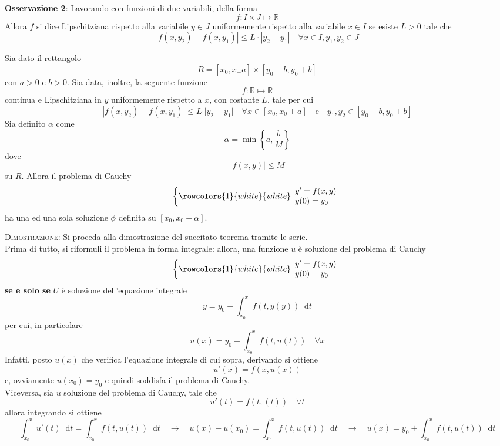 \documentclass[a4paper]{extarticle}
\newcommand*\dif{\mathop{}\!\mathrm{d}}
\begin{document}
\vspace{2em}
\noindent
\textbf{Osservazione 2}: Lavorando con funzioni di due variabili, della forma
\[f : I \times J \longmapsto \mathbb{R}\]
Allora $f$ si dice Lipschitziana rispetto alla variabile $y \in J$ uniformemente rispetto alla variabile $x \in I$ se esiste $L>0$ tale che
\[\left\vert f(x,y_2) - f(x,y_1) \right\vert \leq L \cdot \left\vert y_2 - y_1 \right\vert \hspace{1em} \forall x \in I, y_1,y_2 \in J\]


Sia dato il rettangolo
\[R=\left[x_0,x_+a\right] \times \left[y_0-b,y_0+b\right]\]
con $a>0$ e $b>0$. Sia data, inoltre, la seguente funzione
\[f : \mathbb{R} \longmapsto \mathbb{R}\]
continua e Lipschitziana in $y$ uniformemente rispetto a $x$, con costante $L$, tale per cui
\[\left\vert f(x,y_2) - f(x,y_1)\right\vert \leq L \cdot \vert y_2-y_1 \vert \hspace{1em} \forall x \in \left[x_0,x_0+a\right] \hspace{1em} \text{e} \hspace{1em} y_1,y_2 \in \left[y_0-b,y_0+b\right]\]
Sia definito $\alpha$ come
\[\alpha = \min \left\{a,\dfrac{b}{M}\right\}\]
dove
\[\left\vert f(x,y) \right \vert \leq M\]
su $R$. Allora il problema di Cauchy
\[\left\{
    \rowcolors{1}{white}{white}
    \begin{array}{lll}
        y'=f(x,y)\\
        y(0)=y_0
    \end{array}
\right.\]
ha una ed una sola soluzione $\phi$ definita su $\left[x_0,x_0+\alpha\right]$.

\vspace{2em}
\noindent
\normalfont \normalsize
\textsc{Dimostrazione}: Si proceda alla dimostrazione del succitato teorema tramite le serie.\\
Prima di tutto, si riformuli il problema in forma integrale: allora, una funzione $u$ è soluzione del problema di Cauchy 
\[\left\{
    \rowcolors{1}{white}{white}
    \begin{array}{lll}
        y'=f(x,y)\\
        y(0)=y_0
    \end{array}
\right.\]
\textbf{se e solo se} $U$ è soluzione dell'equazione integrale
\[y=y_0+\int_{x_0}^x f(t,y(y)) \dif t\]
per cui, in particolare
\[u(x) = y_0 + \int_{x_0}^x f(t,u(t)) \hspace{1em} \forall x\]
Infatti, posto $u(x)$ che verifica l'equazione integrale di cui sopra, derivando si ottiene
\[u'(x)=f(x,u(x))\]
e, ovviamente $u(x_0)=y_0$ e quindi soddisfa il problema di Cauchy.\\
Viceversa, sia $u$ soluzione del problema di Cauchy, tale che
\[u'(t) = f(t,(t)) \hspace{1em} \forall t\]
allora integrando si ottiene
\[\int_{x_0}^x u'(t) \dif t = \int_{x_0}^x f(t,u(t)) \dif t \hspace{1em} \rightarrow \hspace{1em} u(x)-u(x_0) = \int_{x_0}^x f(t,u(t)) \dif t \hspace{1em} \rightarrow \hspace{1em} u(x)= y_0 + \int_{x_0}^x f(t,u(t)) \dif t\]
\end{document}
